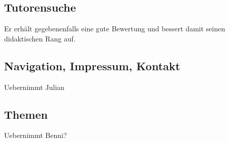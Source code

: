 \subsection{Tutorensuche}
\begin{k}
Er erhält gegebenenfalls eine gute Bewertung und
bessert damit seinen didaktischen Rang auf.
\end{k}

\subsection{Navigation, Impressum, Kontakt}
\begin{k}
Uebernimmt Julian
\end{k}

\subsection{Themen}
\begin{k}
Uebernimmt Benni?
\end{k}